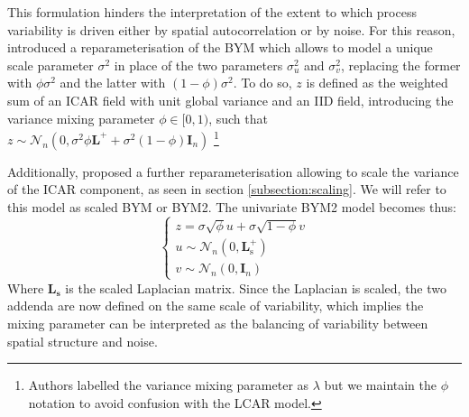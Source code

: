 \documentclass[openany, 11pt, oneside]{book}
\begin{document}
This formulation hinders the interpretation of the extent to which process variability is driven either by spatial autocorrelation or by noise. For this reason, \cite{Dean2001} introduced a reparameterisation of the BYM which allows to model a unique scale parameter $\sigma^2$ in place of the two parameters $\sigma_u^2$ and $\sigma_v^2$, replacing the former with $\phi \sigma^2$ and the latter with $(1-\phi) \sigma^2$. To do so, $z$ is defined as the weighted sum of an ICAR field with unit global variance and an IID field, introducing the variance mixing parameter $\phi \in [0,1)$, such that $z \sim \mathcal{N}_n \left( 0, \sigma^2 \phi \boldsymbol{L}^+ + \sigma^2(1-\phi) \boldsymbol{I}_n \right)$ \footnote{Authors labelled the variance mixing parameter as $\lambda$ but we maintain the $\phi$ notation to avoid confusion with the LCAR model.}

Additionally, \cite{BYM2} proposed a further reparameterisation allowing to scale the variance of the ICAR component, as seen in section \ref{subsection:scaling}. We will refer to this model as scaled BYM or BYM2. The univariate BYM2 model becomes thus:
$$
\left\{ \begin{array}{ll} 
z = \sigma \sqrt{\phi} u + \sigma \sqrt{1-\phi}v \\
u \sim \mathcal{N}_{n} \left(0, \boldsymbol{L}_{\mathrm{s}}^{+} \right)\\
v \sim \mathcal{N}_{n}\left(0, \boldsymbol{I}_n\right)
\end{array} \right.
$$
Where $\boldsymbol{L_s}$ is the scaled Laplacian matrix. Since the Laplacian is scaled, the two addenda are now defined on the same scale of variability, which implies the mixing parameter can be interpreted as the balancing of variability between spatial structure and noise. 
\end{document}

